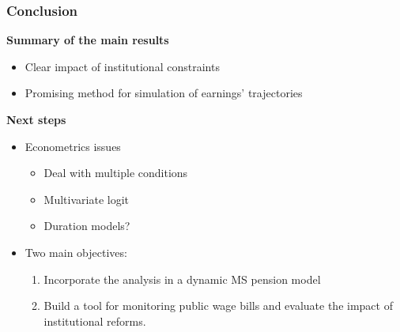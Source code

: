 \documentclass[xcolor=table,ignorenonframetext,12pt]{beamer}
\newenvironment{choixmarges}[2]{\begin{list}{}{%
\setlength{\topsep}{0pt}%
\setlength{\leftmargin}{0pt}%
\setlength{\rightmargin}{0pt}%
\setlength{\listparindent}{\parindent}%
\setlength{\itemindent}{\parindent}%
\setlength{\parsep}{0pt plus 1pt}%
\addtolength{\leftmargin}{#1}%
\addtolength{\rightmargin}{#2}%
}\item }{\end{list}}
\begin{document}
\begin{frame}

\frametitle{Conclusion}

\begin{choixmarges}{-0.5cm}{-0.5cm}


\textbf{Summary of the main results}

\begin{itemize}
\item Clear impact of institutional constraints
\item Promising method for simulation of earnings' trajectories
\end{itemize}

\vspace{0.2cm}
\textbf{Next steps}

\begin{itemize}
\item Econometrics issues
	\begin{itemize}
	\item Deal with multiple conditions
	\item Multivariate logit
	\item Duration models?
	\end{itemize}
\item Two main objectives: 
\begin{enumerate}
\item Incorporate the analysis in a dynamic MS pension model
\item Build a tool for monitoring public wage bills and evaluate the impact of institutional reforms.
\end{enumerate}
 
\end{itemize}


\end{choixmarges}
\end{frame}
\end{document}
